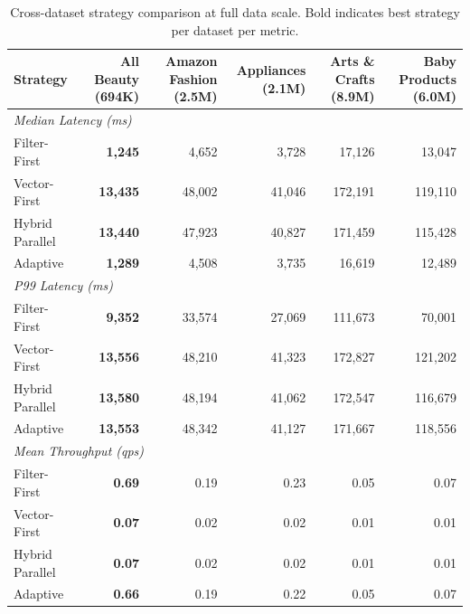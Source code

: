 \begin{table}[ht]
\centering
\small
\begin{tabular}{lrrrrr}
\hline
Strategy & All Beauty (694K) & Amazon Fashion (2.5M) & Appliances (2.1M) & Arts \& Crafts (8.9M) & Baby Products (6.0M) \\
\hline
\multicolumn{6}{l}{\textit{Median Latency (ms)}} \\
\hline
Filter-First & \textbf{1,245} & 4,652 & 3,728 & 17,126 & 13,047 \\
Vector-First & \textbf{13,435} & 48,002 & 41,046 & 172,191 & 119,110 \\
Hybrid Parallel & \textbf{13,440} & 47,923 & 40,827 & 171,459 & 115,428 \\
Adaptive & \textbf{1,289} & 4,508 & 3,735 & 16,619 & 12,489 \\
\hline
\multicolumn{6}{l}{\textit{P99 Latency (ms)}} \\
\hline
Filter-First & \textbf{9,352} & 33,574 & 27,069 & 111,673 & 70,001 \\
Vector-First & \textbf{13,556} & 48,210 & 41,323 & 172,827 & 121,202 \\
Hybrid Parallel & \textbf{13,580} & 48,194 & 41,062 & 172,547 & 116,679 \\
Adaptive & \textbf{13,553} & 48,342 & 41,127 & 171,667 & 118,556 \\
\hline
\multicolumn{6}{l}{\textit{Mean Throughput (qps)}} \\
\hline
Filter-First & \textbf{0.69} & 0.19 & 0.23 & 0.05 & 0.07 \\
Vector-First & \textbf{0.07} & 0.02 & 0.02 & 0.01 & 0.01 \\
Hybrid Parallel & \textbf{0.07} & 0.02 & 0.02 & 0.01 & 0.01 \\
Adaptive & \textbf{0.66} & 0.19 & 0.22 & 0.05 & 0.07 \\
\hline
\end{tabular}
\caption{Cross-dataset strategy comparison at full data scale. Bold indicates best strategy per dataset per metric.}
\label{tab:cross-dataset}
\end{table}